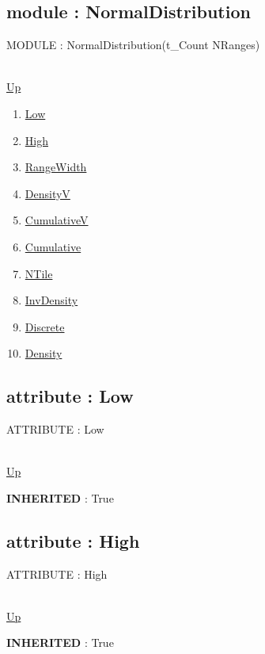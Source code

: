\subsection*{module : NormalDistribution}
\hypertarget{ecldoc:linearregression.ols.normaldistribution}{MODULE : NormalDistribution(t\_Count NRanges)} \\
\hyperlink{ecldoc:linearregression.ols}{Up} \\
\par
\begin{enumerate}
\item \hyperlink{ecldoc:linearregression.ols.distributionbase.low}{Low}
\item \hyperlink{ecldoc:linearregression.ols.distributionbase.high}{High}
\item \hyperlink{ecldoc:linearregression.ols.distributionbase.rangewidth}{RangeWidth}
\item \hyperlink{ecldoc:linearregression.ols.distributionbase.densityv}{DensityV}
\item \hyperlink{ecldoc:linearregression.ols.distributionbase.cumulativev}{CumulativeV}
\item \hyperlink{ecldoc:linearregression.ols.distributionbase.cumulative}{Cumulative}
\item \hyperlink{ecldoc:linearregression.ols.distributionbase.ntile}{NTile}
\item \hyperlink{ecldoc:linearregression.ols.distributionbase.invdensity}{InvDensity}
\item \hyperlink{ecldoc:linearregression.ols.distributionbase.discrete}{Discrete}
\item \hyperlink{ecldoc:linearregression.ols.normaldistribution.density}{Density}
\end{enumerate}
\subsection*{attribute : Low}
\hypertarget{ecldoc:linearregression.ols.distributionbase.low}{ATTRIBUTE : Low} \\
\hyperlink{ecldoc:linearregression.ols.normaldistribution}{Up} \\
\par
\textbf{INHERITED} : True \\
\subsection*{attribute : High}
\hypertarget{ecldoc:linearregression.ols.distributionbase.high}{ATTRIBUTE : High} \\
\hyperlink{ecldoc:linearregression.ols.normaldistribution}{Up} \\
\par
\textbf{INHERITED} : True \\
